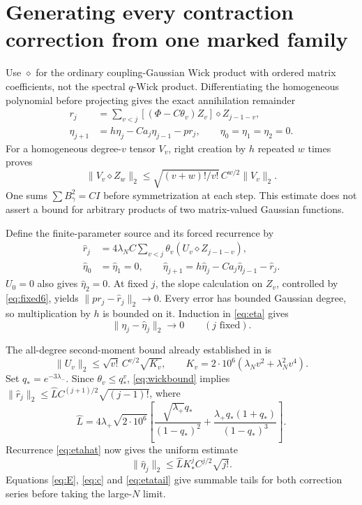 \documentclass[11pt]{article}
\newcommand{\rhat}{\widehat r}
\newcommand{\ehat}{\widehat\eta}
\begin{document}
\newpage
\section{Generating every contraction correction from one marked family}
Use $\diamond$ for the ordinary coupling-Gaussian Wick product with
ordered matrix coefficients, not the spectral $q$-Wick product.
Differentiating the homogeneous polynomial before projecting gives
the exact annihilation remainder
\begin{align}
 r_j&=\sum_{v<j}[(\Phi-C\theta_v)Z_v]\diamond Z_{j-1-v},\label{eq:r}\\
 \eta_{j+1}&=h\eta_j-Ca_j\eta_{j-1}-pr_j,
 \qquad\eta_0=\eta_1=\eta_2=0.\label{eq:eta}
\end{align}
For a homogeneous degree-$v$ tensor $V_v$, right creation by $h$
repeated $w$ times proves
\begin{equation}
 \|V_v\diamond Z_w\|_2\le
 \sqrt{(v+w)!/v!}\,C^{w/2}\|V_v\|_2.\label{eq:wickbound}
\end{equation}
One sums $\sum B_\gamma^2=CI$ before symmetrization at each step.
This estimate does not assert a bound for arbitrary products of two
matrix-valued Gaussian functions.

Define the finite-parameter source and its forced recurrence by
\begin{align}
 \rhat_j&=4\lambda_NC\sum_{v<j}\theta_v
                          (U_v\diamond Z_{j-1-v}),\label{eq:rhat}\\
 \ehat_0&=\ehat_1=0,\qquad
 \ehat_{j+1}=h\ehat_j-Ca_j\ehat_{j-1}-\rhat_j.\label{eq:etahat}
\end{align}
$U_0=0$ also gives $\ehat_2=0$. At fixed $j$, the slope calculation
on $Z_v$, controlled by \eqref{eq:fixed6}, yields
$\|pr_j-\rhat_j\|_2\to0$.
Every error has bounded Gaussian degree, so multiplication by $h$
is bounded on it. Induction in \eqref{eq:eta} gives
\begin{equation}
 \|\eta_j-\ehat_j\|_2\longrightarrow0\qquad(j\text{ fixed}).\label{eq:etalim}
\end{equation}

The all-degree second-moment bound already established in \cite{Rank} is
\begin{equation}
 \|U_v\|_2\le\sqrt{v!}\,C^{v/2}\sqrt{K_v},\qquad
 K_v=2\cdot10^6(\lambda_Nv^2+\lambda_N^2v^4).
\end{equation}
Set $q_*=e^{-3\lambda_-}$. Since $\theta_v\le q_*^v$, \eqref{eq:wickbound}
implies $\|\rhat_j\|_2\le\widehat L C^{(j+1)/2}\sqrt{(j-1)!}$, where
\begin{equation}
 \widehat L=4\lambda_+\sqrt{2\cdot10^6}
 \left[\frac{\sqrt{\lambda_+}q_*}{(1-q_*)^2}
 +\frac{\lambda_+q_*(1+q_*)}{(1-q_*)^3}\right].
\end{equation}
Recurrence \eqref{eq:etahat} now gives the uniform estimate
\begin{equation}
 \|\ehat_j\|_2\le\widehat L K_*^j C^{j/2}\sqrt{j!}.\label{eq:etatail}
\end{equation}
Equations \eqref{eq:E}, \eqref{eq:c} and \eqref{eq:etatail} give summable
tails for both correction series before taking the large-$N$ limit.
\end{document}
